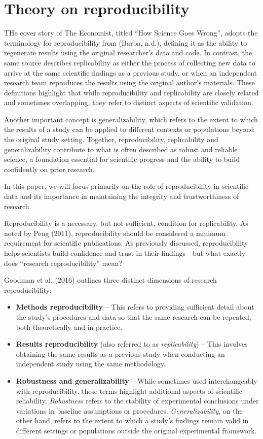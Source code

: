 \documentclass[
  a4paper,
]{article}
\providecommand{\tightlist}{%
  \setlength{\itemsep}{0pt}\setlength{\parskip}{0pt}}\usepackage{longtable,booktabs,array}
\begin{document}
\section{Theory on reproducibility}\label{theory-on-reproducibility}

THe cover story of The Economist, titled ``How Science Goes Wrong'',
adopts the terminology for reproducibility from (Barba, n.d.), defining
it as the ability to regenerate results using the original researcher's
data and code. In contrast, the same source describes replicability as
either the process of collecting new data to arrive at the same
scientific findings as a previous study, or when an independent research
team reproduces the results using the original author's materials. These
definitions highlight that while reproducibility and replicability are
closely related and sometimes overlapping, they refer to distinct
aspects of scientific validation.

Another important concept is generalizability, which refers to the
extent to which the results of a study can be applied to different
contexts or populations beyond the original study setting. Together,
reproducibility, replicability and generalizability contribute to what
is often described as robust and reliable science, a foundation
essential for scientific progress and the ability to build confidently
on prior research.

In this paper, we will focus primarily on the role of reproducibility in
scientific data and its importance in maintaining the integrity and
trustworthiness of research.

Reproducibility is a necessary, but not sufficient, condition for
replicability. As noted by Peng (2011), reproducibility should be
considered a minimum requirement for scientific publications. As
previously discussed, reproducibility helps scientists build confidence
and trust in their findings---but what exactly does ``research
reproducibility'' mean?

Goodman et al. (2016) outlines three distinct dimensions of research
reproducibility:

\begin{itemize}
\tightlist
\item
  \textbf{Methods reproducibility} -- This refers to providing
  sufficient detail about the study's procedures and data so that the
  same research can be repeated, both theoretically and in practice.
\item
  \textbf{Results reproducibility} (also referred to as
  \emph{replicability}) -- This involves obtaining the same results as a
  previous study when conducting an independent study using the same
  methodology.
\item
  \textbf{Robustness and generalizability} -- While sometimes used
  interchangeably with reproducibility, these terms highlight additional
  aspects of scientific reliability. \emph{Robustness} refers to the
  stability of experimental conclusions under variations in baseline
  assumptions or procedures. \emph{Generalizability}, on the other hand,
  refers to the extent to which a study's findings remain valid in
  different settings or populations outside the original experimental
  framework.
\end{itemize}
\end{document}
